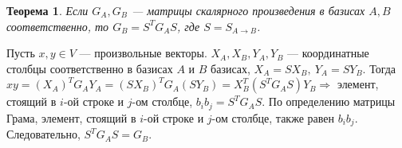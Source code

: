 \newtheorem*{th14_1_3}{Теорема}\begin{th14_1_3}
	Если $G_A, G_B$ --- матрицы скалярного произведения в базисах $A, B$ соответственно, то $G_B = S^TG_AS$, где $S = S_{A\rightarrow B}$.
\end{th14_1_3}\begin{Proof}
	Пусть $x,y \in V$ --- произвольные векторы. $X_A,X_B,Y_A,Y_B$ --- координатные столбцы соответственно в базисах $A$ и $B$ базисах, $X_A = SX_B,\ Y_A = SY_B$. Тогда \\$xy = (X_A)^TG_AY_A = (SX_B)^TG_A(SY_B) = X^T_B(S^TG_AS)Y_B\Rightarrow$ элемент, стоящий в $i$-ой строке и $j$-ом столбце, $b_i b_j = S^TG_AS$. По определению матрицы Грама, элемент, стоящий в $i$-ой строке и $j$-ом столбце, также равен $b_ib_j$. Следовательно, $S^TG_AS = G_B$.
\end{Proof}







